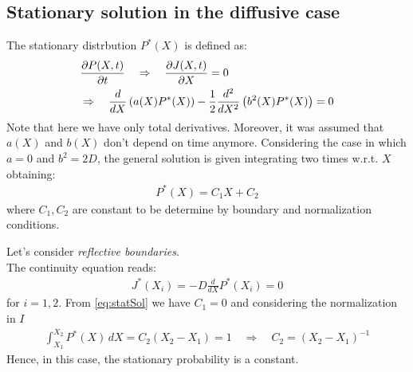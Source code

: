 \documentclass[4apaper,11pt,fleqn]{article}
\theoremstyle{remark}
\theoremstyle{definition}
\begin{document}
\subsection{Stationary solution in the diffusive case}
The stationary distrbution $P^{*}(X)$ is defined as:
\begin{align}
  \label{eq:dx_flux}
  &\frac{\partial P(X, t)}{\partial t} \quad \Rightarrow \quad \frac{\partial J(X, t)}{\partial X}=0 \\ \notag
  &\Rightarrow \quad \frac{d}{d X}\left(a(X) P^{*}(X)\right)-\frac{1}{2} \frac{d^{2}}{d X^{2}}\left(b^{2}(X) P^{*}(X)\right)=0
\end{align}
Note that here we have only total derivatives. Moreover, it was assumed that $a(X)$ and $b(X)$ don't depend on time anymore.
Considering the case in which $a = 0$ and $b^2 =2D$, the general solution is given integrating two times w.r.t. $X$ obtaining:
\begin{align}
  \label{eq:statSol}
  P^*(X) = C_1 X + C_2
\end{align}
where $C_1, C_2$ are constant to be determine by boundary and normalization conditions.

Let's consider \emph{reflective boundaries}.\\
The continuity equation reads:
\begin{align*}
  J^* (X_i) = -D \frac{d }{d X} P^*(X_i) = 0
\end{align*}
for $i = 1,2$. From \eqref{eq:statSol} we have $C_1 = 0$ and considering the normalization in $I$
\begin{align*}
  \int_{X_1}^{X_2} P^* (X) \, dX = C_2 (X_2 - X_1) = 1 \quad \Rightarrow \quad C_2 = (X_2 - X_1)^{-1}
\end{align*}
Hence, in this case, the stationary probability is a constant.
\end{document}
